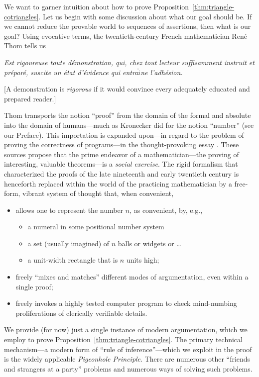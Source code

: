 We want to garner intuition about how to prove Proposition~\ref{thm:triangle-cotriangles}.  Let us begin with some discussion about what our goal should be.  If we cannot reduce the provable world to sequences of assertions, then what is our goal?  Using evocative terms, the twentieth-century French mathematician Ren\'{e} Thom tells us

\bigskip

\begin{minipage}{0.96\textwidth}
{\em Est rigoureuse toute d\'{e}monstration, qui, chez tout lecteur suffisamment instruit et pr\'{e}par\'{e}, suscite un \'{e}tat d'\'{e}vidence qui entra$\hat{i}$ne l'adh\'{e}sion.}

\smallskip

[A demonstration is {\em rigorous} if it would convince every adequately educated and prepared reader.]
\end{minipage}

\bigskip

\noindent
Thom transports the notion ``proof'' from the domain of the formal and absolute into the domain of humans---much as Kronecker did for the notion ``number'' (see our Preface).  This importation is expanded upon---in regard to the problem of proving the correctness of
programs---in the thought-provoking essay \cite{DeMilloLP79}.  These sources propose that the prime endeavor of a mathematician---the proving of interesting, valuable theorems---is a {\em social exercise}.  The rigid formalism that characterized the proofs of the late nineteenth and early twentieth century is henceforth replaced within the world of the practicing mathematician by a free-form, vibrant system of thought that, when convenient,
\begin{itemize}
\item
allows one to represent the number $n$, as convenient, by, e.g.,
  \begin{itemize}
  \item
a numeral in some positional number system
  \medskip\item
a set (usually imagined) of $n$ balls or widgets or \ldots
  \medskip\item
a unit-width rectangle that is $n$ units high;
  \end{itemize}

\medskip\item
freely ``mixes and matches'' different modes of argumentation, even within a single proof;

\medskip\item
freely invokes a highly tested computer program to check mind-numbing proliferations of clerically verifiable details.
\end{itemize}
We provide (for now) just a single instance of modern argumentation, which we employ to prove Proposition~\ref{thm:triangle-cotriangles}.  The primary technical mechanism---a modern form of ``rule of inference''---which we exploit in the proof is the widely applicable {\it Pigeonhole Principle}.  There are numerous other ``friends and strangers at a party'' problems and numerous ways of solving such problems.

